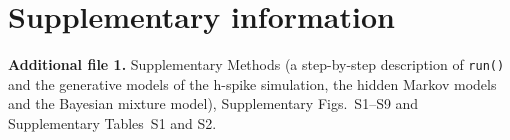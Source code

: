 \section*{Supplementary information}\label{sec:supplementary_information}

\textbf{Additional file 1.} Supplementary Methods (a step-by-step description of \texttt{run()} and the generative models of the h-spike simulation, the hidden Markov models and the Bayesian mixture model), Supplementary Figs.~S1--S9 and Supplementary Tables~S1 and S2.
